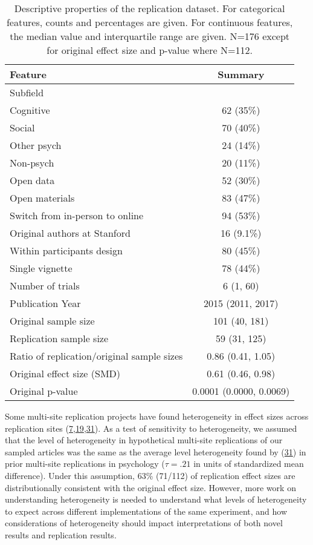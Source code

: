 \documentclass[
  english,
  a4paper,
]{article}
\begin{document}
\begin{table}[!h]

\caption{\label{tab:unnamed-chunk-5}Descriptive properties of the replication dataset. For categorical features, counts and percentages are given. For continuous features, the median value and interquartile range are given. N=176 except for original effect size and p-value where N=112. }
\centering
\fontsize{10}{12}\selectfont
\begin{tabular}[t]{lc}
\toprule
Feature & Summary\\
\midrule
Subfield & \\
\hspace{1em}Cognitive & 62 (35\%)\\
\hspace{1em}Social & 70 (40\%)\\
\hspace{1em}Other psych & 24 (14\%)\\
\hspace{1em}Non-psych & 20 (11\%)\\
Open data & 52 (30\%)\\
Open materials & 83 (47\%)\\
Switch from in-person to online & 94 (53\%)\\
Original authors at Stanford & 16 (9.1\%)\\
Within participants design & 80 (45\%)\\
Single vignette & 78 (44\%)\\
Number of trials & 6 (1, 60)\\
Publication Year & 2015 (2011, 2017)\\
Original sample size & 101 (40, 181)\\
Replication sample size & 59 (31, 125)\\
Ratio of replication/original sample sizes & 0.86 (0.41, 1.05)\\
Original effect size (SMD) & 0.61 (0.46, 0.98)\\
Original p-value & 0.0001 (0.0000, 0.0069)\\
\bottomrule
\end{tabular}
\end{table}

Some multi-site replication projects have found heterogeneity in effect sizes across replication sites (\protect\hyperlink{ref-klein2018}{7},\protect\hyperlink{ref-ebersole2020}{19},\protect\hyperlink{ref-olsson2020}{31}). As a test of sensitivity to heterogeneity, we assumed that the level of heterogeneity in hypothetical multi-site replications of our sampled articles was the same as the average level heterogeneity found by (\protect\hyperlink{ref-olsson2020}{31}) in prior multi-site replications in psychology (\(\tau=.21\) in units of standardized mean difference). Under this assumption, 63\% (71/112) of replication effect sizes are distributionally consistent with the original effect size. However, more work on understanding heterogeneity is needed to understand what levels of heterogeneity to expect across different implementations of the same experiment, and how considerations of heterogeneity should impact interpretations of both novel results and replication results.
\end{document}
